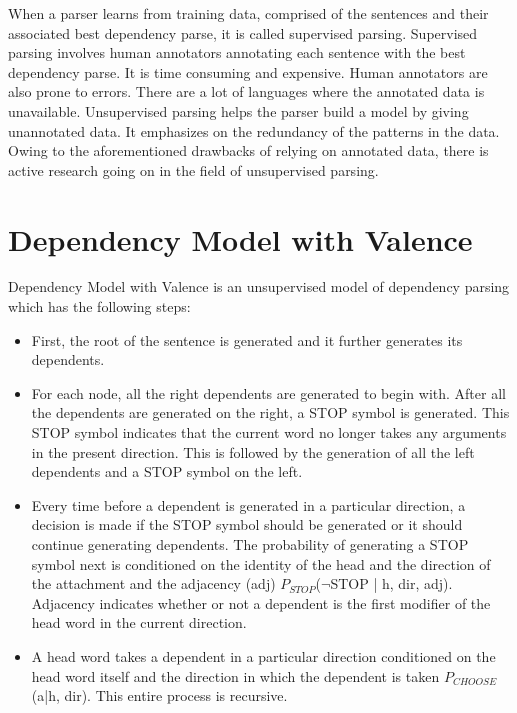 \documentclass{article}
\begin{document}
When a parser learns from training data, comprised of the sentences and their associated best dependency parse, it is called supervised parsing.
Supervised parsing involves human annotators annotating each sentence with the best dependency parse. It is time consuming and expensive. Human annotators are also prone to errors. There are a lot of languages where the annotated data is unavailable. Unsupervised parsing helps the parser build a model by giving unannotated data. It emphasizes on the redundancy of the patterns in the data. Owing to the aforementioned drawbacks of relying on annotated data, there is active research going on in the field of unsupervised parsing.

\section{Dependency Model with Valence}

Dependency Model with Valence is an unsupervised model of dependency parsing which has the following steps:

\begin{itemize}

\item First, the root of the sentence is generated and it further generates its dependents.

\item For each node, all the right dependents are generated to begin with. After all the dependents are generated on the right, a STOP symbol is generated. This STOP symbol indicates that the current word no longer takes any arguments in the present direction. This is followed by the generation of all the left dependents and a STOP symbol on the left. 

\item Every time before a dependent is generated in a particular direction, a decision is made if the STOP symbol should be generated or it should continue generating dependents. The probability of generating a STOP symbol next is conditioned on the identity of the head and the direction of the attachment and the adjacency (adj) $P_{STOP}$($\neg$STOP | h, dir, adj). Adjacency indicates whether or not a dependent is the first modifier of the head word in the current direction.

\item A head word takes a dependent in a particular direction conditioned on the head word itself and the direction in which the dependent is taken $P_{CHOOSE}$(a|h, dir). This entire process is recursive.

\end{itemize}
\end{document}
